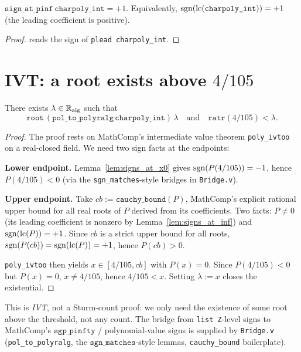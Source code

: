 \begin{lemma}\label{lem:signs_at_inf}
\rocqok
$\texttt{sign\_at\_pinf}\,\texttt{charpoly\_int} = +1$.
Equivalently, $\operatorname{sgn}(\operatorname{lc}(\texttt{charpoly\_int})) = +1$ (the
leading coefficient is positive).
\end{lemma}
\begin{proof}\rocqok
\vmcompute{} reads the sign of \texttt{plead\,charpoly\_int}.
\end{proof}

\section{IVT: a root exists above \texorpdfstring{$4/105$}{4/105}}

\begin{theorem}\label{thm:maynard_L1}
\rocqok
{}
There exists $\lambda \in \mathbb{R}_{\mathrm{alg}}$ such that
\[
\texttt{root}\,(\texttt{pol\_to\_polyralg}\,\texttt{charpoly\_int})\,\lambda
\quad\text{and}\quad
\texttt{ratr}(4/105) < \lambda.
\]
\end{theorem}
\begin{proof}\rocqok
The proof rests on MathComp's intermediate value theorem
\texttt{poly\_ivtoo} on a real-closed field. We need two sign facts at
the endpoints:

\textbf{Lower endpoint.} Lemma~\ref{lem:signs_at_x0} gives
$\operatorname{sgn}(P(4/105)) = -1$, hence $P(4/105) < 0$ (via the
\texttt{sgn\_matches}-style bridges in \texttt{Bridge.v}).

\textbf{Upper endpoint.} Take $cb := \texttt{cauchy\_bound}(P)$,
MathComp's explicit rational upper bound for all real roots of $P$
derived from its coefficients. Two facts: $P \ne 0$ (its leading
coefficient is nonzero by Lemma~\ref{lem:signs_at_inf}) and
$\operatorname{sgn}(\operatorname{lc}(P)) = +1$. Since $cb$ is a strict upper bound for all
roots, $\operatorname{sgn}(P(cb)) = \operatorname{sgn}(\operatorname{lc}(P)) = +1$, hence $P(cb) > 0$.

\texttt{poly\_ivtoo} then yields $x \in [4/105, cb]$ with $P(x) = 0$.
Since $P(4/105) < 0$ but $P(x) = 0$, $x \ne 4/105$, hence
$4/105 < x$. Setting $\lambda := x$ closes the existential.
\end{proof}

\begin{remark}
This is \emph{IVT}, not a Sturm-count proof: we only need the
existence of some root above the threshold, not any count. The
bridge from \texttt{list Z}-level signs to MathComp's
$\texttt{sgp\_pinfty}$ / polynomial-value signs is supplied by
\texttt{Bridge.v} (\texttt{pol\_to\_polyralg}, the
$\texttt{sgn\_matches}$-style lemmas, \texttt{cauchy\_bound}
boilerplate).
\end{remark}

